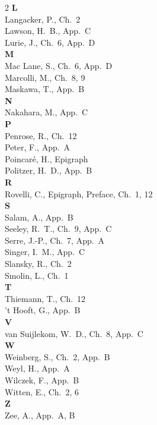 \documentclass[11pt,a4paper,openright]{book}
\theoremstyle{plain}
\theoremstyle{definition}
\begin{document}
\begin{multicols}{2}
\textbf{L}\\
Langacker, P., Ch.~2\\
Lawson, H.~B., App.~C\\
Lurie, J., Ch.~6, App.~D\\[2pt]

\textbf{M}\\
Mac Lane, S., Ch.~6, App.~D\\
Marcolli, M., Ch.~8, 9\\
Maskawa, T., App.~B\\[2pt]

\textbf{N}\\
Nakahara, M., App.~C\\[2pt]

\textbf{P}\\
Penrose, R., Ch.~12\\
Peter, F., App.~A\\
Poincaré, H., Epigraph\\
Politzer, H.~D., App.~B\\[2pt]

\textbf{R}\\
Rovelli, C., Epigraph, Preface, Ch.~1, 12\\[2pt]

\textbf{S}\\
Salam, A., App.~B\\
Seeley, R.~T., Ch.~9, App.~C\\
Serre, J.-P., Ch.~7, App.~A\\
Singer, I.~M., App.~C\\
Slansky, R., Ch.~2\\
Smolin, L., Ch.~1\\[2pt]

\textbf{T}\\
Thiemann, T., Ch.~12\\
't Hooft, G., App.~B\\[2pt]

\textbf{V}\\
van Suijlekom, W.~D., Ch.~8, App.~C\\[2pt]

\textbf{W}\\
Weinberg, S., Ch.~2, App.~B\\
Weyl, H., App.~A\\
Wilczek, F., App.~B\\
Witten, E., Ch.~2, 6\\[2pt]

\textbf{Z}\\
Zee, A., App.~A, B\\

\end{multicols}
\end{document}
